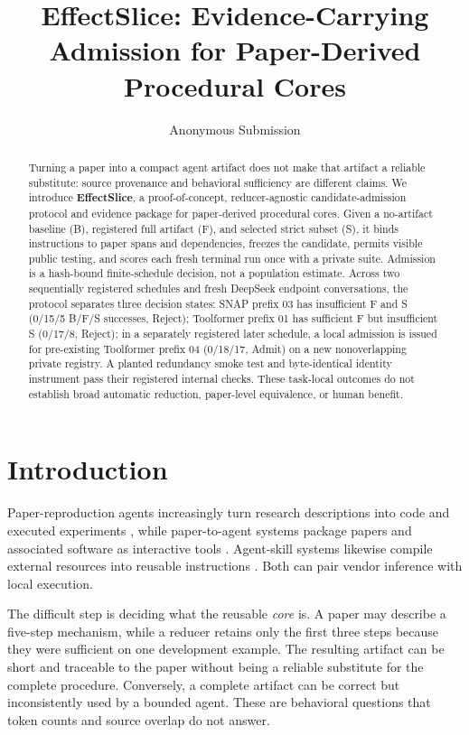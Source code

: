 \documentclass[letterpaper]{article} %
\title{EffectSlice: Evidence-Carrying Admission for Paper-Derived Procedural Cores}
\author{Anonymous Submission}
\begin{document}
\maketitle

\begin{abstract}
Turning a paper into a compact agent artifact does not make that artifact a
reliable substitute: source provenance and behavioral sufficiency are different
claims.  We introduce \textbf{EffectSlice}, a proof-of-concept, reducer-agnostic
candidate-admission protocol and evidence package
for paper-derived procedural cores.  Given a no-artifact baseline (B), registered
full artifact (F), and selected strict subset (S), it binds instructions to paper
spans and dependencies, freezes the candidate, permits visible public testing,
and scores each fresh terminal run once with a private suite.  Admission is a
hash-bound finite-schedule decision, not a population estimate.  Across two
sequentially registered schedules and \AllProviderConversations{} fresh DeepSeek
endpoint conversations, the protocol separates three decision states: SNAP
prefix 03 has insufficient F and S (0/15/5 B/F/S successes, Reject); Toolformer
prefix 01 has sufficient F but insufficient S (0/17/8, Reject); in a separately
registered later schedule, a local admission is issued for pre-existing
Toolformer prefix 04 (0/18/17, Admit) on a new nonoverlapping private registry.
A planted redundancy smoke test and byte-identical identity instrument pass
their registered internal checks.  These task-local outcomes do not establish
broad automatic reduction, paper-level equivalence, or human benefit.
\end{abstract}

\section{Introduction}

Paper-reproduction agents increasingly turn research descriptions into code and
executed experiments \cite{starace2025paperbench,zhao2025autoreproduce}, while
paper-to-agent systems package papers and associated software as interactive
tools \cite{miao2025paper2agent}.  Agent-skill systems likewise compile external
resources into reusable instructions
\cite{shen2026skillfoundry,pan2026anything2skill}.  Both can pair vendor inference
with local execution.

The difficult step is deciding what the reusable \emph{core} is.  A paper may
describe a five-step mechanism, while a reducer retains only the first three
steps because they were sufficient on one development example.  The resulting
artifact can be short and traceable to the paper without being a reliable
substitute for the complete procedure.  Conversely, a complete artifact can be
correct but inconsistently used by a bounded agent.  These are behavioral
questions that token counts and source overlap do not answer.
\end{document}
